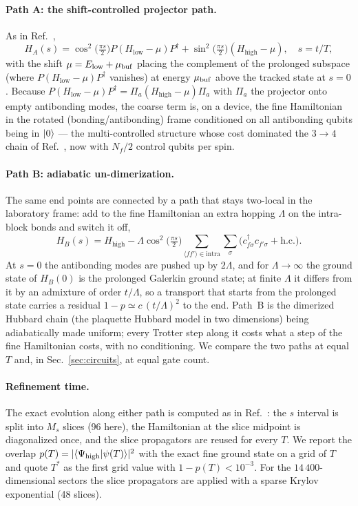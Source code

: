 \documentclass[
  aps,
  prc,
  reprint,
  superscriptaddress,
  floatfix,
  nofootinbib
]{revtex4-2}
\newcommand{\Hlow}{H_{\mathrm{low}}}
\newcommand{\Hhigh}{H_{\mathrm{high}}}
\begin{document}
\paragraph{Path A: the shift-controlled projector path.}
As in Ref.~\cite{EigenQPairing2026},
\begin{equation}
  H_A(s)=\cos^2\!\big(\tfrac{\pi s}{2}\big)P(\Hlow-\mu)P^\dagger
        +\sin^2\!\big(\tfrac{\pi s}{2}\big)(\Hhigh-\mu),\quad s=t/T,
  \label{eq:pathA}
\end{equation}
with the shift $\mu=E_{\rm low}+\mu_{\rm buf}$ placing the complement of the
prolonged subspace (where $P(\Hlow-\mu)P^\dagger$ vanishes) at energy
$\mu_{\rm buf}$ above the tracked state at $s=0$.  Because
$P(\Hlow-\mu)P^\dagger=\Pi_a(\Hhigh-\mu)\Pi_a$ with $\Pi_a$ the projector onto
empty antibonding modes, the coarse term is, on a device, the fine
Hamiltonian in the rotated (bonding/antibonding) frame conditioned on all
antibonding qubits being in $\ket{0}$ --- the multi-controlled structure whose
cost dominated the $3\to4$ chain of Ref.~\cite{EigenQPairing2026}, now with
$N_f/2$ control qubits per spin.

\paragraph{Path B: adiabatic un-dimerization.}
The same end points are connected by a path that stays two-local in the
laboratory frame: add to the fine Hamiltonian an extra hopping $\Lambda$ on
the intra-block bonds and switch it off,
\begin{equation}
  H_B(s)=\Hhigh-\Lambda\cos^2\!\big(\tfrac{\pi s}{2}\big)
  \sum_{\langle ff'\rangle\in\mathrm{intra}}\sum_\sigma
  \big(c^\dagger_{f\sigma}c_{f'\sigma}+\mathrm{h.c.}\big).
  \label{eq:pathB}
\end{equation}
At $s=0$ the antibonding modes are pushed up by $2\Lambda$, and for
$\Lambda\to\infty$ the ground state of $H_B(0)$ is the prolonged Galerkin
ground state; at finite $\Lambda$ it differs from it by an admixture of
order $t/\Lambda$, so a transport that starts from the prolonged state
carries a residual $1-p\simeq c\,(t/\Lambda)^2$ to the end.  Path~B is the
dimerized Hubbard chain (the plaquette Hubbard model in two dimensions)
being adiabatically made uniform; every Trotter step along it costs what a
step of the fine Hamiltonian costs, with no conditioning.  We compare the
two paths at equal $T$ and, in Sec.~\ref{sec:circuits}, at equal gate
count.

\paragraph{Refinement time.}
The exact evolution along either path is computed as in
Ref.~\cite{EigenQPairing2026}: the $s$ interval is split into $M_s$ slices
(96 here), the Hamiltonian at the slice midpoint is diagonalized once, and
the slice propagators are reused for every $T$.  We report the overlap
$p(T)=|\langle\Psi_{\rm high}|\psi(T)\rangle|^2$ with the exact fine ground
state on a grid of $T$ and quote $T^*$ as the first grid value with
$1-p(T)<10^{-3}$.  For the $14\,400$-dimensional sectors the slice
propagators are applied with a sparse Krylov exponential (48 slices).
\end{document}
